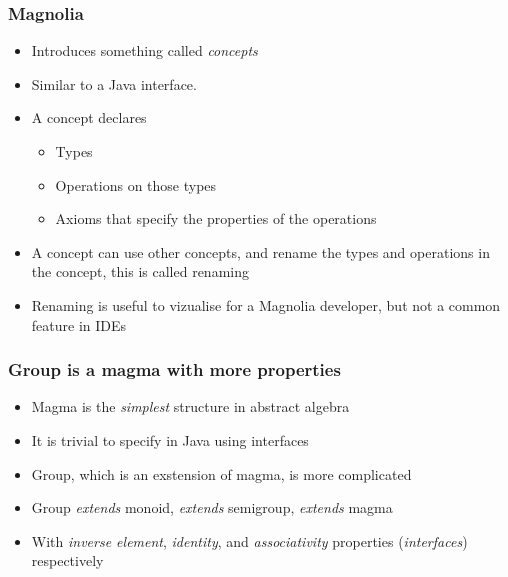 \begin{frame}
  \frametitle{Magnolia}
  \begin{itemize}
    \item Introduces something called \textit{concepts}
      \pause
    \item Similar to a Java interface.
      \pause
    \item A concept declares
      \begin{itemize}
      \pause
        \item Types
      \pause
        \item Operations on those types
      \pause
        \item Axioms that specify the properties of the operations
      \end{itemize}
      \pause
    \item A concept can use other concepts, and rename the types and operations
      in the concept, this is called renaming
      \pause
    \item Renaming is useful to vizualise for a Magnolia developer, but not a
    common feature in IDEs
  \end{itemize}
\end{frame}

\begin{frame}
  \frametitle{Group is a magma with more properties}
  \begin{itemize}
    \item Magma is the \textit{simplest} structure in abstract algebra
      \pause
    \item It is trivial to specify in Java using interfaces
      \pause
    \item Group, which is an exstension of magma, is more complicated
      \pause
    \item Group \textit{extends} monoid, \textit{extends} semigroup,
      \textit{extends} magma
      \pause
    \item With \textit{inverse element}, \textit{identity}, and
      \textit{associativity} properties (\textit{interfaces}) respectively
  \end{itemize}
\end{frame}

